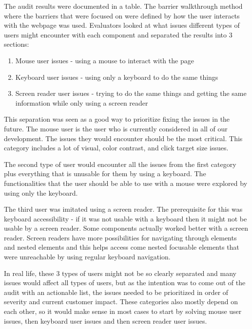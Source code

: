 \documentclass{master_thesis}
\begin{document}
The audit results were documented in a table. The barrier walkthrough method where the barriers that were focused on were defined by how the user interacts with the webpage was used. Evaluators looked at what issues different types of users might encounter with each component and separated the results into 3 sections:
\begin{enumerate}
	\item Mouse user issues - using a mouse to interact with the page
	\item Keyboard user issues - using only a keyboard to do the same things
	\item Screen reader user issues - trying to do the same things and getting the same information while only using a screen reader
\end{enumerate}

This separation was seen as a good way to prioritize fixing the issues in the future. The mouse user is the user who is currently considered in all of our development. The issues they would encounter should be the most critical. This category includes a lot of visual, color contrast, and click target size issues.

The second type of user would encounter all the issues from the first category plus everything that is unusable for them by using a keyboard. The functionalities that the user should be able to use with a mouse were explored by using only the keyboard.

The third user was imitated using a screen reader. The prerequisite for this was keyboard accessibility - if it was not usable with a keyboard then it might not be usable by a screen reader. Some components actually worked better with a screen reader. Screen readers have more possibilities for navigating through elements and nested elements and this helps access come nested focusable elements that were unreachable by using regular keyboard navigation.

In real life, these 3 types of users might not be so clearly separated and many issues would affect all types of users, but as the intention was to come out of the audit with an actionable list, the issues needed to be prioritized in order of severity and current customer impact. These categories also mostly depend on each other, so it would make sense in most cases to start by solving mouse user issues, then keyboard user issues and then screen reader user issues.
\end{document}
